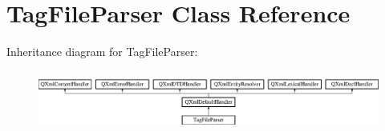 \hypertarget{class_tag_file_parser}{}\section{Tag\+File\+Parser Class Reference}
\label{class_tag_file_parser}
Inheritance diagram for Tag\+File\+Parser\+:\begin{figure}[H]
\begin{center}
\leavevmode
\includegraphics[height=2.014389cm]{class_tag_file_parser}
\end{center}
\end{figure}
